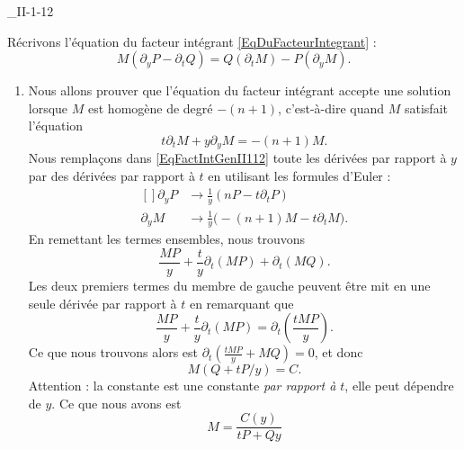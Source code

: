 \begin{corrige}{_II-1-12}

	Récrivons l'équation du facteur intégrant \eqref{EqDuFacteurIntegrant} :
	\begin{equation}		\label{EqFactIntGenII112}
		M(\partial_yP-\partial_tQ)=Q(\partial_tM)-P(\partial_yM).
	\end{equation}

	\begin{enumerate}

		\item
		      Nous allons prouver que l'équation du facteur intégrant accepte une solution lorsque $M$ est homogène de degré $-(n+1)$, c'est-à-dire quand $M$ satisfait l'équation
		      \begin{equation}
			      t\partial_tM+y\partial_yM=-(n+1)M.
		      \end{equation}
		      Nous remplaçons dans \eqref{EqFactIntGenII112} toute les dérivées par rapport à $y$ par des dérivées par rapport à $t$ en utilisant les formules d'Euler :
		      \begin{equation}
			      \begin{aligned}[]
				      \partial_yP & \to \frac{1}{ y }(nP-t\partial_tP)                 \\
				      \partial_yM & \to \frac{1}{ y }\big( -(n+1)M-t\partial_tM \big).
			      \end{aligned}
		      \end{equation}
		      En remettant les termes ensembles, nous trouvons
		      \begin{equation}
			      \frac{ MP }{ y }+\frac{ t }{ y }\partial_t(MP)+\partial_t(MQ).
		      \end{equation}
		      Les deux premiers termes du membre de gauche peuvent être mit en une seule dérivée par rapport à $t$ en remarquant que
		      \begin{equation}
			      \frac{ MP }{ y }+\frac{ t }{ y }\partial_t(MP)=\partial_t\left( \frac{ tMP }{ y } \right).
		      \end{equation}
		      Ce que nous trouvons alors est $\partial_t\left( \frac{ tMP }{ y }+MQ \right)=0$, et donc
		      \begin{equation}
			      M(Q+tP/y)=C.
		      \end{equation}
		      Attention : la constante est une constante \emph{par rapport à $t$}, elle peut dépendre de $y$. Ce que nous avons est
		      \begin{equation}
			      M=\frac{ C(y) }{ tP+Qy }

\end{equation}
\end{enumerate}
\end{corrige}
